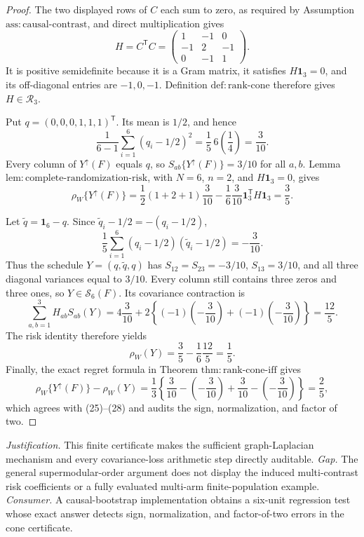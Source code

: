 \documentclass{article}
\begin{document}
\begin{proof}
The two displayed rows of \(C\) each sum to zero, as required by Assumption \(\mathrm{ass{:}causal\text{-}contrast}\), and direct multiplication gives
\[
H=C^{\mathsf T}C=
\begin{pmatrix}1&-1&0\\-1&2&-1\\0&-1&1\end{pmatrix}.
\]
It is positive semidefinite because it is a Gram matrix, it satisfies \(H\mathbf 1_3=0\), and its off-diagonal entries are \(-1,0,-1\).  Definition \(\mathrm{def{:}rank\text{-}cone}\) therefore gives \(H\in\mathcal R_3\).

Put \(q=(0,0,0,1,1,1)^{\mathsf T}\).  Its mean is \(1/2\), and hence
\[
\frac1{6-1}\sum_{i=1}^6(q_i-1/2)^2
=\frac15\,6\left(\frac14\right)=\frac3{10}. \tag{24}
\]
Every column of \(Y^{\uparrow}(F)\) equals \(q\), so \(S_{ab}\{Y^{\uparrow}(F)\}=3/10\) for all \(a,b\).  Lemma \(\mathrm{lem{:}complete\text{-}randomization\text{-}risk}\), with \(N=6\), \(n=2\), and \(H\mathbf 1_3=0\), gives
\[
\rho_W\{Y^{\uparrow}(F)\}
=\frac12(1+2+1)\frac3{10}
-\frac16\frac3{10}\mathbf 1_3^{\mathsf T}H\mathbf 1_3
=\frac35. \tag{25}
\]

Let \(\widetilde q=\mathbf 1_6-q\).  Since \(\widetilde q_i-1/2=-(q_i-1/2)\),
\[
\frac15\sum_{i=1}^6(q_i-1/2)(\widetilde q_i-1/2)=-\frac3{10}. \tag{26}
\]
Thus the schedule \(Y=(q,\widetilde q,q)\) has \(S_{12}=S_{23}=-3/10\), \(S_{13}=3/10\), and all three diagonal variances equal to \(3/10\).  Every column still contains three zeros and three ones, so \(Y\in\mathcal S_6(F)\).  Its covariance contraction is
\[
\sum_{a,b=1}^3H_{ab}S_{ab}(Y)
=4\frac3{10}+2\left\{(-1)\left(-\frac3{10}\right)+(-1)\left(-\frac3{10}\right)\right\}
=\frac{12}{5}. \tag{27}
\]
The risk identity therefore yields
\[
\rho_W(Y)=\frac35-\frac16\frac{12}{5}=\frac15. \tag{28}
\]
Finally, the exact regret formula in Theorem \(\mathrm{thm{:}rank\text{-}cone\text{-}iff}\) gives
\[
\rho_W\{Y^{\uparrow}(F)\}-\rho_W(Y)
=\frac13\left\{\frac3{10}-\left(-\frac3{10}\right)
+\frac3{10}-\left(-\frac3{10}\right)\right\}=\frac25, \tag{29}
\]
which agrees with (25)--(28) and audits the sign, normalization, and factor of two.
\end{proof}
\par\smallskip\noindent \textit{Justification.} This finite certificate makes the sufficient graph-Laplacian mechanism and every covariance-loss arithmetic step directly auditable. \textit{Gap.} The general supermodular-order argument does not display the induced multi-contrast risk coefficients or a fully evaluated multi-arm finite-population example. \textit{Consumer.} A causal-bootstrap implementation obtains a six-unit regression test whose exact answer detects sign, normalization, and factor-of-two errors in the cone certificate.
\end{document}
